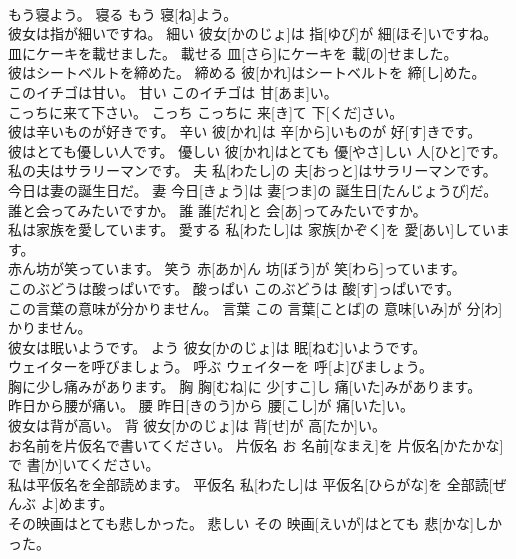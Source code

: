 \documentclass[8pt]{extreport}
\begin{document}
\begin{CJK}{UTF8}{min}
\\	もう寝よう。	寝る	もう 寝[ね]よう。	
\\	彼女は指が細いですね。	細い	彼女[かのじょ]は 指[ゆび]が 細[ほそ]いですね。	
\\	皿にケーキを載せました。	載せる	皿[さら]にケーキを 載[の]せました。	
\\	彼はシートベルトを締めた。	締める	彼[かれ]はシートベルトを 締[し]めた。	
\\	このイチゴは甘い。	甘い	このイチゴは 甘[あま]い。	
\\	こっちに来て下さい。	こっち	こっちに 来[き]て 下[くだ]さい。	
\\	彼は辛いものが好きです。	辛い	彼[かれ]は 辛[から]いものが 好[す]きです。	
\\	彼はとても優しい人です。	優しい	彼[かれ]はとても 優[やさ]しい 人[ひと]です。	
\\	私の夫はサラリーマンです。	夫	私[わたし]の 夫[おっと]はサラリーマンです。	
\\	今日は妻の誕生日だ。	妻	今日[きょう]は 妻[つま]の 誕生日[たんじょうび]だ。	
\\	誰と会ってみたいですか。	誰	誰[だれ]と 会[あ]ってみたいですか。	
\\	私は家族を愛しています。	愛する	私[わたし]は 家族[かぞく]を 愛[あい]しています。	
\\	赤ん坊が笑っています。	笑う	赤[あか]ん 坊[ぼう]が 笑[わら]っています。	
\\	このぶどうは酸っぱいです。	酸っぱい	このぶどうは 酸[す]っぱいです。	
\\	この言葉の意味が分かりません。	言葉	この 言葉[ことば]の 意味[いみ]が 分[わ]かりません。	
\\	彼女は眠いようです。	よう	彼女[かのじょ]は 眠[ねむ]いようです。	
\\	ウェイターを呼びましょう。	呼ぶ	ウェイターを 呼[よ]びましょう。	
\\	胸に少し痛みがあります。	胸	胸[むね]に 少[すこ]し 痛[いた]みがあります。	
\\	昨日から腰が痛い。	腰	昨日[きのう]から 腰[こし]が 痛[いた]い。	
\\	彼女は背が高い。	背	彼女[かのじょ]は 背[せ]が 高[たか]い。	
\\	お名前を片仮名で書いてください。	片仮名	お 名前[なまえ]を 片仮名[かたかな]で 書[か]いてください。	
\\	私は平仮名を全部読めます。	平仮名	私[わたし]は 平仮名[ひらがな]を 全部読[ぜんぶ よ]めます。	
\\	その映画はとても悲しかった。	悲しい	その 映画[えいが]はとても 悲[かな]しかった。	

\end{CJK}
\end{document}
